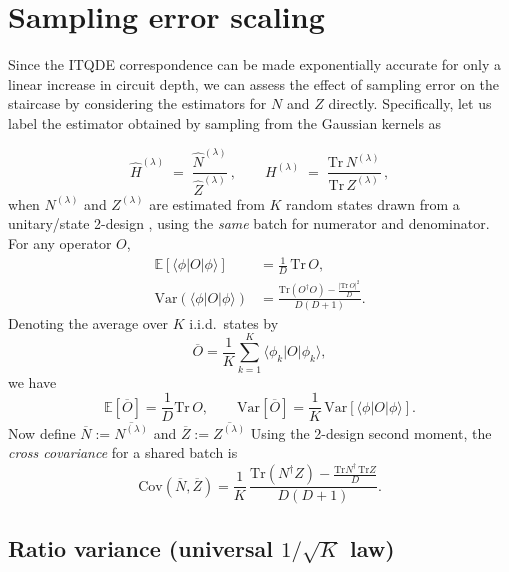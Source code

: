 \documentclass[reprint, aps,prx,showpacs,bibfootnote,preprintnumbers, mathtools, superscriptaddress, amsmath,amssymb]{revtex4-2}
\begin{document}
\section{Sampling error scaling \label{app:Sampling}}
Since the ITQDE correspondence can be made exponentially accurate for only a linear increase in circuit depth, we can assess the effect of sampling error on the staircase by considering the estimators for $N$ and $Z$ directly. Specifically, let us label the estimator obtained by sampling from the Gaussian kernels as

\begin{equation}
\widehat H^{(\lambda)} \;=\; \frac{\widehat N^{(\lambda)}}{\widehat Z^{(\lambda)}}\,,
\qquad
H^{(\lambda)} \;=\; \frac{\mathrm{Tr}\,N^{(\lambda)}}{\mathrm{Tr}\,Z^{(\lambda)}}\,,
\end{equation}
when \(N^{(\lambda)}\) and \(Z^{(\lambda)}\) are estimated from \(K\) random states drawn from a unitary/state 2-design \cite{PhysRevA.80.012304}, using the \emph{same} batch for numerator and denominator. For any operator \(O\),
\begin{align}
\mathbb{E}\!\left[\langle\phi|O|\phi\rangle\right] &= \frac{1}{D}\,\mathrm{Tr}\,O,
\label{eq:A1}\\
\mathrm{Var}\!\left(\langle\phi|O|\phi\rangle\right)
&= \frac{\mathrm{Tr}(O^\dagger O)-\frac{|\mathrm{Tr}\,O|^2}{D}}{D(D+1)}.
\label{eq:A2}
\end{align}
Denoting the average over \(K\) i.i.d.~states by
\begin{equation}
\overline O=\frac1K\sum_{k=1}^K \langle\phi_k|O|\phi_k\rangle,
\end{equation}
we have
\begin{equation}
\mathbb{E}[\overline O]=\frac{1}{D}\mathrm{Tr}\,O,\qquad
\mathrm{Var}[\overline O]=\frac{1}{K}\,\mathrm{Var}\left[\langle\phi|O|\phi\rangle\right].
\label{eq:A3}
\end{equation}
Now define $\overline N:=\overline{N^{(\lambda)}}$ and $\overline Z:=\overline{Z^{(\lambda)}}$
Using the 2-design second moment, the \emph{cross covariance} for a shared batch is
\begin{equation}
\mathrm{Cov}(\overline N,\overline Z)
=\frac{1}{K}\,\frac{ \mathrm{Tr}(N^\dagger Z)-\frac{\mathrm{Tr}N^\dagger\,\mathrm{Tr}Z}{D} }{D(D+1)}.
\label{eq:A4}
\end{equation}

\subsection*{Ratio variance (universal \(1/\sqrt{K}\) law)}
\end{document}
